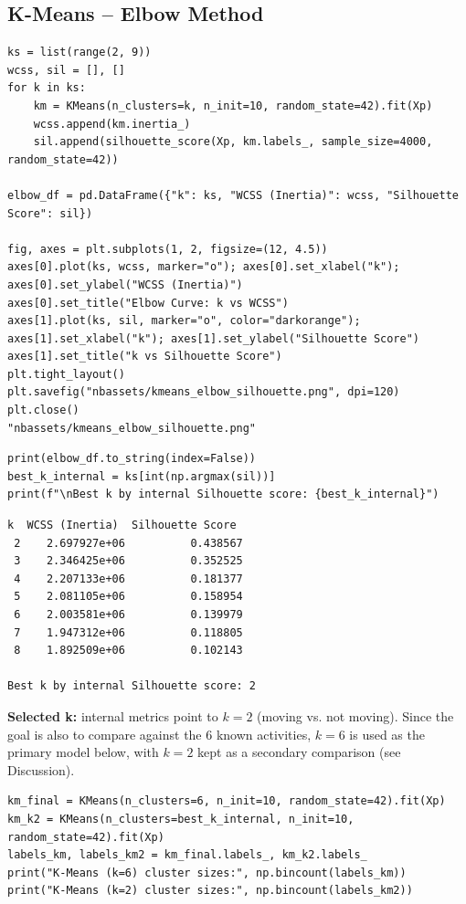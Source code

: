 \documentclass[12pt,a4paper]{article}
\begin{document}
\subsection{K-Means -- Elbow Method}
\label{sec:org07da15e}

\begin{verbatim}
ks = list(range(2, 9))
wcss, sil = [], []
for k in ks:
    km = KMeans(n_clusters=k, n_init=10, random_state=42).fit(Xp)
    wcss.append(km.inertia_)
    sil.append(silhouette_score(Xp, km.labels_, sample_size=4000, random_state=42))

elbow_df = pd.DataFrame({"k": ks, "WCSS (Inertia)": wcss, "Silhouette Score": sil})

fig, axes = plt.subplots(1, 2, figsize=(12, 4.5))
axes[0].plot(ks, wcss, marker="o"); axes[0].set_xlabel("k"); axes[0].set_ylabel("WCSS (Inertia)")
axes[0].set_title("Elbow Curve: k vs WCSS")
axes[1].plot(ks, sil, marker="o", color="darkorange"); axes[1].set_xlabel("k"); axes[1].set_ylabel("Silhouette Score")
axes[1].set_title("k vs Silhouette Score")
plt.tight_layout()
plt.savefig("nbassets/kmeans_elbow_silhouette.png", dpi=120)
plt.close()
"nbassets/kmeans_elbow_silhouette.png"
\end{verbatim}

\url{}

\begin{verbatim}
print(elbow_df.to_string(index=False))
best_k_internal = ks[int(np.argmax(sil))]
print(f"\nBest k by internal Silhouette score: {best_k_internal}")
\end{verbatim}

\begin{verbatim}
k  WCSS (Inertia)  Silhouette Score
 2    2.697927e+06          0.438567
 3    2.346425e+06          0.352525
 4    2.207133e+06          0.181377
 5    2.081105e+06          0.158954
 6    2.003581e+06          0.139979
 7    1.947312e+06          0.118805
 8    1.892509e+06          0.102143

Best k by internal Silhouette score: 2
\end{verbatim}

\textbf{Selected k:} internal metrics point to \(k=2\) (moving vs. not moving).
Since the goal is also to compare against the 6 known activities, \(k=6\) is
used as the primary model below, with \(k=2\) kept as a secondary comparison
(see Discussion).

\begin{verbatim}
km_final = KMeans(n_clusters=6, n_init=10, random_state=42).fit(Xp)
km_k2 = KMeans(n_clusters=best_k_internal, n_init=10, random_state=42).fit(Xp)
labels_km, labels_km2 = km_final.labels_, km_k2.labels_
print("K-Means (k=6) cluster sizes:", np.bincount(labels_km))
print("K-Means (k=2) cluster sizes:", np.bincount(labels_km2))
\end{verbatim}
\end{document}
